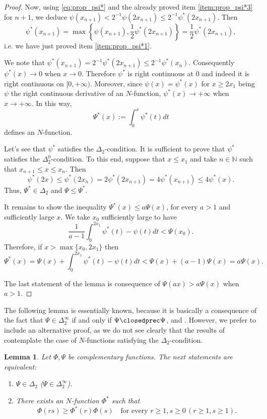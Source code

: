 \documentclass[twoside]{elsarticle}
\newtheorem{lem}[thm]{Lemma}
\theoremstyle{remark}
\renewcommand{\leq}{\leqslant}
\renewcommand{\geq}{\geqslant}
\begin{document}
\begin{proof}
Now, using \eqref{eq:prop_psi*} and the already proved item \ref{item:prop_psi*3} for $n+1$, we deduce $\psi(x_{n+1})<2^{-1}\psi(2x_{n+1})\leq 2^{-1}\psi^*(2x_{n+1})$.
Then
\[\psi^*(x_{n+1})=\max\left\{\psi(x_{n+1}),\frac12\psi^*(2x_{n+1}) \right\}=\frac12\psi^*(2x_{n+1}),\]
i.e. we have just proved item \ref{item:prop_psi*1}.

We note that $\psi^*(x_{n+1})=2^{-1}\psi^*(2x_{n+1})\leq 2^{-1}\psi^*(x_{n})$. Consequently $\psi^*(x)\to 0$ when $x\to 0$.
Therefore $\psi^*$ is right continuous at $0$ and indeed it is right continuous on $[0,+\infty)$. 
Moreover, since $\psi(x)=\psi^*(x)$ for $x\geq 2x_1$ being $\psi$ the right continuous derivative of an $N$-function, $\psi^*(x)\to +\infty$ when $x\to +\infty$. In this way,
\[\Psi^*(x):=\int_0^x\psi^*(t)dt\]
defines an $N$-function.

Let's see that $\psi^*$ satisfies the $\Delta_2$-condition.
It is sufficient to prove that $\psi^*$ satisfies the $ \Delta_2^0$-condition. 
To this end, suppose that  $x\leq x_1$ and take $n\in\mathbb{N}$ such that $x_{n+1}\leq x\leq x_n$. Then
\[\psi^*(2x)\leq \psi^*(2x_n)=2\psi^*(2x_{n+1})=4\psi^*(x_{n+1})\leq 4\psi^*(x).\]
Thus,  $\Psi^* \in  \Delta_2$ and $\Psi\leq \Psi^*$.

It remains to show the inequality $\Psi^*(x)\leq a\Psi(x)$, 
for every $a>1$ and sufficiently large $x$. We take $x_0$ sufficiently large to have
\[\frac{1}{a-1}\int_0^{2x_1}\psi^*(t)-\psi(t)dt<\Psi(x_0).\]
Therefore, if  $x>\max\{x_0,2x_1\}$ then
\[\Psi^*(x)=\Psi(x)+\int_0^{2x_1}\psi^*(t)-\psi(t)dt<\Psi(x)+(a-1)\Psi(x)= a\Psi(x).\]

The last statement of the lemma is consequence of   $\Psi(ax)>a\Psi(x)$ when $a>1$. 

\end{proof}



The following lemma is essentially known,  because it is basically a consequence  of the fact that $\Psi\in\Delta_2^{\infty}$ if and only if $\Psi\closedprec\Psi$,  \cite[Prop. 4, p. 20]{rao1991theory} and \cite[Cor. 10, p. 30]{rao1991theory}. 
However, we prefer to include an alternative proof, as we do not see clearly that the results of \cite{rao1991theory} contemplate the case of  $N$-functions satisfying the $\Delta_2$-condition.



\begin{lem}\label{lem:submultipliativa}
Let $\Phi,\Psi$ be complementary functions.
The next statements are equivalent:
\begin{enumerate}
\item\label{item1} $\Psi \in \Delta_2$ ($\Psi \in \Delta_2^{\infty}$).
\item\label{item2} There exists an $N$-function $\Phi^*$ such that
\begin{equation}\label{eq:caract_delta2}
\Phi(rs)\geq \Phi^*(r)\Phi(s)\quad\mbox{for every }r\geq1,s\geq 0\, (r\geq1,s\geq 1).
\end{equation}
\end{enumerate}
\end{lem}
\end{document}

